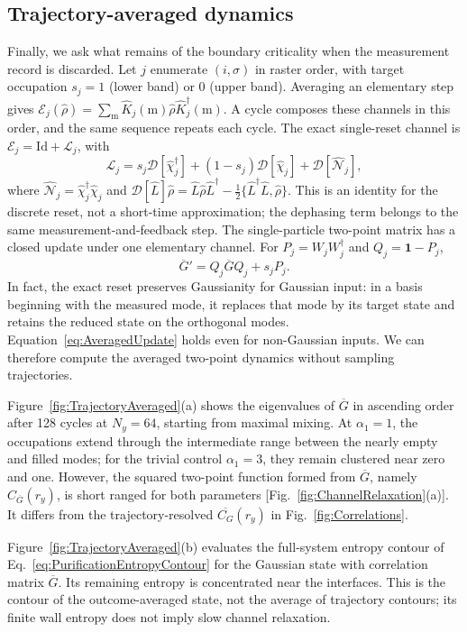 \documentclass[aps,prb,10pt,twocolumn,superscriptaddress,longbibliography,floatfix]{revtex4-2}
\newcommand{\mc}[1]{\mathcal{#1}}
\newcommand{\Id}{\mathbf{1}}
\newcommand{\newtext}[1]{{\color{blue}#1}}
\newcommand{\claudeadd}[1]{{\color{orange}#1}}
\begin{document}
{\color{blue}
\subsection{Trajectory-averaged dynamics}
\label{sec:TrajectoryAveraged}

Finally, we ask what remains of the boundary criticality when the measurement record is discarded. Let $j$ enumerate $(i,\sigma)$ in raster order, with target occupation $s_j=1$ (lower band) or $0$ (upper band). Averaging an elementary step gives $\mc E_j(\hat\rho)=\sum_{\mathrm m}\hat K_j(\mathrm m)\hat\rho\hat K_j^\dagger(\mathrm m)$. A cycle composes these channels in this order, and the same sequence repeats each cycle. The exact single-reset channel is $\mc E_j=\mathrm{Id}+\mc L_j$, with
\begin{equation}
 \mc L_j=s_j\mc D[\hat\chi_j^\dagger]+(1-s_j)\mc D[\hat\chi_j]+\mc D[\hat{\mc N}_j],
 \label{eq:AveragedChannel}
\end{equation}
where $\hat{\mc N}_j=\hat\chi_j^\dagger\hat\chi_j$ and $\mc D[\hat L]\hat\rho=\hat L\hat\rho\hat L^\dagger-\tfrac12\{\hat L^\dagger\hat L,\hat\rho\}$. This is an identity for the discrete reset, not a short-time approximation; the dephasing term belongs to the same measurement-and-feedback step. The single-particle two-point matrix has a closed update under one elementary channel. For \claudeadd{$P_j=W_jW_j^\dagger$} and $Q_j=\Id-P_j$,
\begin{equation}
 \overline G'=Q_j\overline GQ_j+s_jP_j.
 \label{eq:AveragedUpdate}
\end{equation}
In fact, the exact reset preserves Gaussianity for Gaussian input: in a basis beginning with the measured mode, it replaces that mode by its target state and retains the reduced state on the orthogonal modes. Equation~\eqref{eq:AveragedUpdate} holds even for non-Gaussian inputs. We can therefore compute the averaged two-point dynamics without sampling trajectories.

Figure~\ref{fig:TrajectoryAveraged}(a) shows the eigenvalues of $\overline G$ in ascending order after 128 cycles at $N_y=64$, starting from maximal mixing. At $\alpha_1=1$, the occupations extend through the intermediate range between the nearly empty and filled modes; for the trivial control $\alpha_1=3$, they remain clustered near zero and one. However, the squared two-point function formed from $\overline G$, namely $C_{\overline G}(r_y)$, is short ranged for both parameters [Fig.~\ref{fig:ChannelRelaxation}(a)]. It differs from the trajectory-resolved $\overline{C_G}(r_y)$ in Fig.~\ref{fig:Correlations}.

\newtext{Figure~\ref{fig:TrajectoryAveraged}(b) evaluates the full-system entropy contour of Eq.~\eqref{eq:PurificationEntropyContour} for the Gaussian state with correlation matrix $\overline G$. Its remaining entropy is concentrated near the interfaces. This is the contour of the outcome-averaged state, not the average of trajectory contours; its finite wall entropy does not imply slow channel relaxation.}

}
\end{document}
